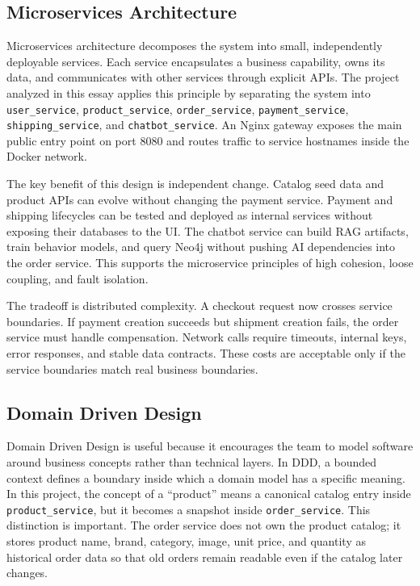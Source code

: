 \documentclass[12pt,a4paper]{article}
\begin{document}
\subsection{Microservices Architecture}

Microservices architecture decomposes the system into small, independently deployable services. Each service encapsulates a business capability, owns its data, and communicates with other services through explicit APIs. The project analyzed in this essay applies this principle by separating the system into \texttt{user\_service}, \texttt{product\_service}, \texttt{order\_service}, \texttt{payment\_service}, \texttt{shipping\_service}, and \texttt{chatbot\_service}. An Nginx gateway exposes the main public entry point on port 8080 and routes traffic to service hostnames inside the Docker network.

The key benefit of this design is independent change. Catalog seed data and product APIs can evolve without changing the payment service. Payment and shipping lifecycles can be tested and deployed as internal services without exposing their databases to the UI. The chatbot service can build RAG artifacts, train behavior models, and query Neo4j without pushing AI dependencies into the order service. This supports the microservice principles of high cohesion, loose coupling, and fault isolation.

The tradeoff is distributed complexity. A checkout request now crosses service boundaries. If payment creation succeeds but shipment creation fails, the order service must handle compensation. Network calls require timeouts, internal keys, error responses, and stable data contracts. These costs are acceptable only if the service boundaries match real business boundaries.

\subsection{Domain Driven Design}

Domain Driven Design is useful because it encourages the team to model software around business concepts rather than technical layers. In DDD, a bounded context defines a boundary inside which a domain model has a specific meaning. In this project, the concept of a ``product'' means a canonical catalog entry inside \texttt{product\_service}, but it becomes a snapshot inside \texttt{order\_service}. This distinction is important. The order service does not own the product catalog; it stores product name, brand, category, image, unit price, and quantity as historical order data so that old orders remain readable even if the catalog later changes.
\end{document}
